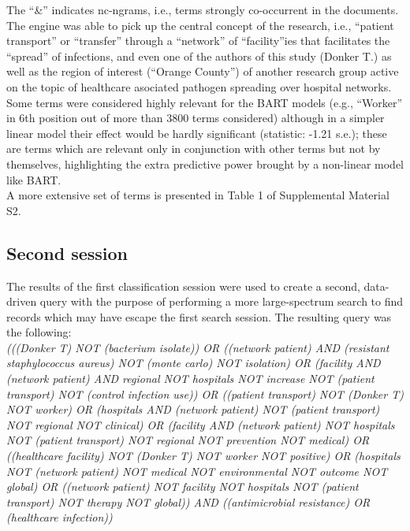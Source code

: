 \documentclass{article}
\begin{document}
The ``\&'' indicates nc-ngrams, i.e., terms strongly co-occurrent in the
documents.\\
The engine was able to pick up the central concept of the research,
i.e., ``patient transport'' or ``transfer'' through a ``network'' of
``facility''ies that facilitates the ``spread'' of infections, and even
one of the authors of this study (Donker T.) as well as the region of
interest (``Orange County'') of another research group active on the
topic of healthcare asociated pathogen spreading over hospital networks.
Some terms were considered highly relevant for the BART models (e.g.,
``Worker'' in 6th position out of more than 3800 terms considered)
although in a simpler linear model their effect would be hardly
significant (statistic: -1.21 s.e.); these are terms which are relevant
only in conjunction with other terms but not by themselves, highlighting
the extra predictive power brought by a non-linear model like BART.\\
A more extensive set of terms is presented in Table 1 of Supplemental
Material S2.

\hypertarget{second-session}{%
\subsection{Second session}\label{second-session}}

The results of the first classification session were used to create a
second, data-driven query with the purpose of performing a more
large-spectrum search to find records which may have escape the first
search session. The resulting query was the following:\\

\emph{(((Donker T) NOT (bacterium isolate)) OR ((network patient) AND
(resistant staphylococcus aureus) NOT (monte carlo) NOT isolation) OR
(facility AND (network patient) AND regional NOT hospitals NOT increase
NOT (patient transport) NOT (control infection use)) OR ((patient
transport) NOT (Donker T) NOT worker) OR (hospitals AND (network
patient) NOT (patient transport) NOT regional NOT clinical) OR (facility
AND (network patient) NOT hospitals NOT (patient transport) NOT regional
NOT prevention NOT medical) OR ((healthcare facility) NOT (Donker T) NOT
worker NOT positive) OR (hospitals NOT (network patient) NOT medical NOT
environmental NOT outcome NOT global) OR ((network patient) NOT facility
NOT hospitals NOT (patient transport) NOT therapy NOT global)) AND
((antimicrobial resistance) OR (healthcare infection))}
\end{document}
